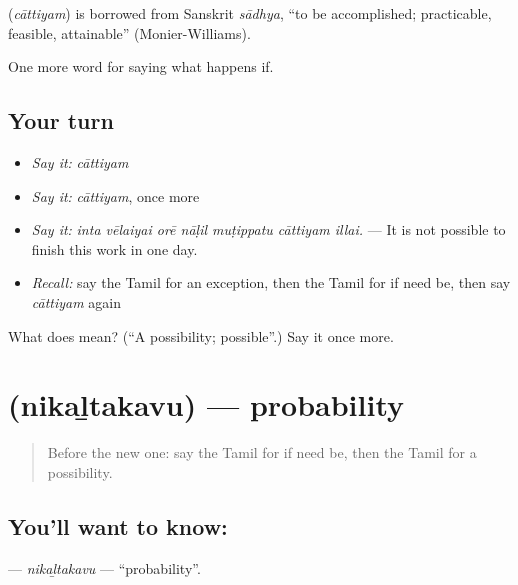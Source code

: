 \begin{cousinweb}
\textbf{} (\emph{cāttiyam}) is borrowed from Sanskrit \emph{sādhya}, \textquotedblleft{}to be accomplished; practicable, feasible, attainable\textquotedblright{} (Monier-Williams).
\end{cousinweb}

\begin{grammarlens}[title={What you've built}]
One more word for saying what happens if.
\end{grammarlens}

\subsection*{Your turn}
\begin{itemize}
\raggedright
  \item \emph{Say it:} \emph{cāttiyam}
  \item \emph{Say it:} \emph{cāttiyam}, once more
  \item \emph{Say it:} \emph{inta vēlaiyai orē nāḷil muṭippatu cāttiyam illai.} — It is not possible to finish this work in one day.
  \item \emph{Recall:} say the Tamil for an exception, then the Tamil for if need be, then say \emph{cāttiyam} again
\end{itemize}

\begin{tcolorbox}[breakable,colback=teal!4,colframe=teal!35!black,title={Before you move on}]
What does  mean? (\textquotedblleft{}A possibility; possible\textquotedblright{}.) Say it once more.
\end{tcolorbox}
\section[\texorpdfstring{\ta{நிகழ்தகவு} (nikaḻtakavu)}{நிகழ்தகவு (nikaḻtakavu)}]{ (nikaḻtakavu) — probability}

\label{lesson:TA-C383-nikaltakavu}



\begin{quote}
Before the new one: say the Tamil for if need be, then the Tamil for a possibility.
\end{quote}

\subsection*{You'll want to know: }
\textbf{} — \emph{nikaḻtakavu} — \textquotedblleft{}probability\textquotedblright{}.

